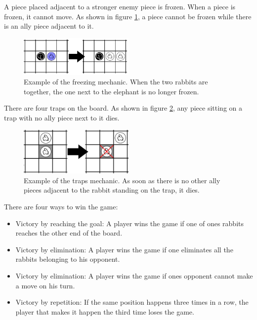 A piece placed adjacent to a stronger enemy piece is frozen. When a piece is frozen, it cannot move. As shown in figure \ref{fig:freeze}, a piece cannot be frozen while there is an ally piece adjacent to it.

\begin{figure}[!h]
\centering
\includegraphics[width=0.5\textwidth]{1_Presentation/1.1_Arimaa_rules_Gabriel/Pictures/Freeze.png}
\caption[Example of the freezing mechanic.]{Example of the freezing mechanic. When the two rabbits are together, the one next to the elephant is no longer frozen.}
\label{fig:freeze}
\end{figure}

There are four traps on the board. As shown in figure \ref{fig:trap}, any piece sitting on a trap with no ally piece next to it dies.

\begin{figure}[!h]
\centering
\includegraphics[width=0.5\textwidth]{1_Presentation/1.1_Arimaa_rules_Gabriel/Pictures/Trap.png}
\caption[Example of the traps mechanic.]{Example of the traps mechanic. As soon as there is no other ally pieces adjacent to the rabbit standing on the trap, it dies.}
\label{fig:trap}
\end{figure}

There are four ways to win the game:

\begin{itemize}
\item Victory by reaching the goal: A player wins the game if one of ones rabbits reaches the other end of the board.
\item Victory by elimination: A player wins the game if one eliminates all the rabbits belonging to his opponent.
\item Victory by elimination: A player wins the game if ones opponent cannot make a move on his turn.
\item Victory by repetition: If the same position happens three times in a row, the player that makes it happen the third time loses the game.
\end{itemize}
